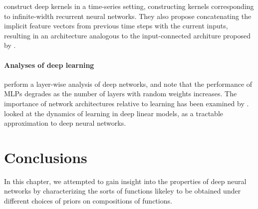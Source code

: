 \cite{hermans2012recurrent} construct deep kernels in a time-series setting, constructing kernels corresponding to infinite-width recurrent neural networks.%
They also propose concatenating the implicit feature vectors from previous time steps with the current inputs, resulting in an architecture analogous to the input-connected architure proposed by \citet{neal1995bayesian}.

\paragraph{Analyses of deep learning}
\cite{montavon2010layer} perform a layer-wise analysis of deep networks, and note that the performance of MLPs degrades as the number of layers with random weights increases.
The importance of network architectures relative to learning has been examined by \cite{saxe2011random}.
\cite{saxedynamics} looked at the dynamics of learning in deep linear models, as a tractable approximation to deep neural networks.  











\section{Conclusions}


In this chapter, we attempted to gain insight into the properties of deep neural networks by characterizing the sorts of functions likeley to be obtained under different choices of priors on compositions of functions.

